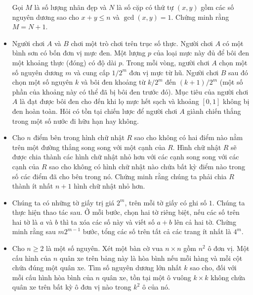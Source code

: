 \documentclass[11pt]{scrartcl}
\begin{document}
\begin{itemize}[label=, leftmargin=0em, itemsep=-0em]
\begin{btvn}
        Gọi $M$ là số lượng nhãn đẹp và $N$ là số cặp có thứ tự $(x, y)$ gồm các số nguyên dương sao cho $x + y \le n$ và $\gcd(x, y) = 1$. Chứng minh rằng $M = N + 1.$
    \end{btvn}

    \item \begin{btvn}
        Người chơi $A$ và $B$ chơi một trò chơi trên trục số thực. Người chơi $A$ có một bình sơn có bốn đơn vị mực đen. Một lượng $p$ của loại mực này đủ để bôi đen một khoảng thực (đóng) có độ dài $p$. Trong mỗi vòng, người chơi $A$ chọn một số nguyên dương $m$ và cung cấp $1/2^m $ đơn vị mực từ hũ. Người chơi $B$ sau đó chọn một số nguyên $k$ và bôi đen khoảng từ $k/2^m$ đến $(k+1)/2^m$ (một số phần của khoảng này có thể đã bị bôi đen trước đó). Mục tiêu của người chơi $A$ là đạt được bôi đen cho đến khi lọ mực hết sạch và khoảng $[0,1]$ không bị đen hoàn toàn.
        Hỏi có tồn tại chiến lược để người chơi $A$ giành chiến thắng trong một số nước đi hữu hạn hay không.
    \end{btvn}
    \item \begin{btvn} Cho $n$ điểm bên trong hình chữ nhật $R$ sao cho không có hai điểm nào nằm trên một đường thẳng song song với một cạnh của $R$. Hình chữ nhật $R$ sẽ được chia thành các hình chữ nhật nhỏ hơn với các cạnh song song với các cạnh của $R$ sao cho không có hình chữ nhật nào chứa bất kỳ điểm nào trong số các điểm đã cho bên trong nó. Chứng minh rằng chúng ta phải chia $R$ thành ít nhất $n + 1$ hình chữ nhật nhỏ hơn.
    \end{btvn}

    \item \begin{btvn}
        Chúng ta có những tờ giấy trị giá $2^m$, trên mỗi tờ giấy có ghi số $1$. Chúng ta thực hiện thao tác sau. Ở mỗi bước, chọn hai tờ riêng biệt, nếu các số trên hai tờ là $a$ và $b$ thì ta xóa các số này và viết số $a + b$ lên cả hai tờ. Chứng minh rằng sau $m2^{m -1}$ bước, tổng các số trên tất cả các trang ít nhất là $4^m$.
    \end{btvn}

    \item \begin{btvn}
        Cho $n \ge 2$ là một số nguyên. Xét một bàn cờ vua $n \times n$ gồm $n^2$ ô đơn vị. Một cấu hình của $n$ quân xe trên bảng này là hòa bình nếu mỗi hàng và mỗi cột chứa đúng một quân xe. Tìm số nguyên dương lớn nhất $k$ sao cho, đối với mỗi cấu hình hòa bình của $n$ quân xe, tồn tại một ô vuông $k \times k$ không chứa quân xe trên bất kỳ ô đơn vị nào trong $k^2$ ô của nó.
    \end{btvn}


\end{itemize}
\end{document}
